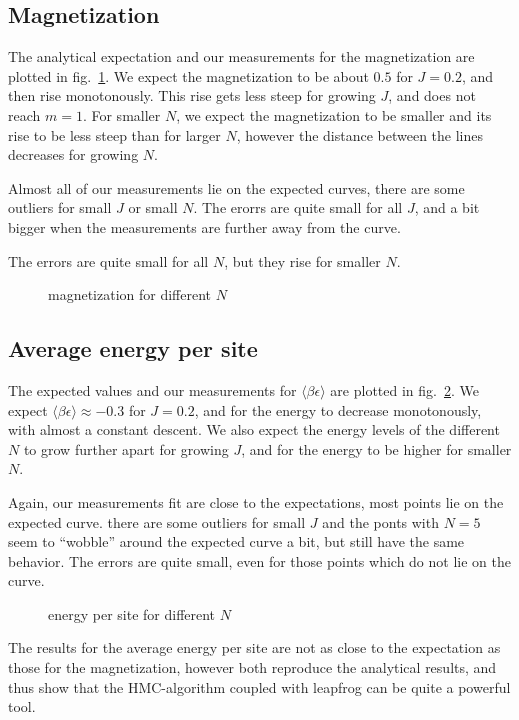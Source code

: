 \documentclass{scrartcl}
\begin{document}
\subsection{Magnetization}

The analytical expectation and our measurements for the magnetization are plotted in fig.~\ref{fig:magnetization}. We expect the magnetization to be about $0.5$ for $J=0.2$, and then rise monotonously. This rise gets less steep for growing $J$, and does not reach $m=1$. For smaller $N$, we expect the magnetization to be smaller and its rise to be less steep than for larger $N$, however the distance between the lines decreases for growing $N$.

Almost all of our measurements lie on the expected curves, there are some outliers for small $J$ or small $N$. The erorrs are quite small for all $J$, and a bit bigger when the measurements are further away from the curve.

The errors are quite small for all $N$, but they rise for smaller $N$.
\begin{figure}[htbp]
	
	\caption{magnetization for different $N$}
	\label{fig:magnetization}
\end{figure}

\subsection{Average energy per site}

The expected values and our measurements for $\langle \beta\epsilon\rangle$ are plotted in fig.~\ref{fig:energy}. We expect $\langle \beta\epsilon\rangle\approx-0.3$ for $J=0.2$, and for the energy to decrease monotonously, with almost a constant descent. We also expect the energy levels of the different $N$ to grow further apart for growing $J$, and for the energy to be higher for smaller $N$.

Again, our measurements fit are close to the expectations, most points lie on the expected curve. there are some outliers for small $J$ and the ponts with $N=5$ seem to \enquote{wobble} around the expected curve a bit, but still have the same behavior.
The errors are quite small, even for those points which do not lie on the curve.
  
\begin{figure}[htbp]
	
	\caption{energy per site for different $N$}
	\label{fig:energy}
\end{figure}

The results for the average energy per site are not as close to the expectation as those for the magnetization, however both reproduce the analytical results, and thus show that the HMC-algorithm coupled with leapfrog can be quite a powerful tool.

\newpage	
\listoffigures
\printbibliography
\end{document}
